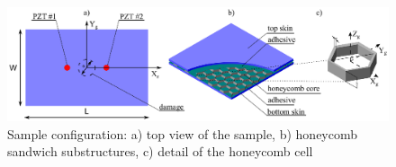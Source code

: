 \documentclass[materials,article,submit,moreauthors,pdftex]{Definitions/mdpi}
\begin{document}
\begin{figure}
	\begin{center}
		\includegraphics[width=1\linewidth]{../../figures/eps/honeycomb.eps}
	\end{center}
	\caption{Sample configuration: a) top view of the sample, b) honeycomb sandwich substructures, c) detail of the honeycomb cell}
	\label{fig:honeycomb}
\end{figure}
\end{document}
